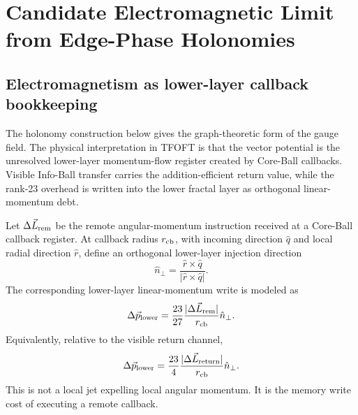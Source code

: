 \documentclass[11pt,a4paper]{article}
\begin{document}
\section{Candidate Electromagnetic Limit from Edge-Phase Holonomies}
\label{sec:maxwell}


\subsection{Electromagnetism as lower-layer callback bookkeeping}
\label{sec:em_callback_bookkeeping}

The holonomy construction below gives the graph-theoretic form of the gauge
field.  The physical interpretation in TFOFT is that the vector potential is
the unresolved lower-layer momentum-flow register created by Core-Ball
callbacks.  Visible Info-Ball transfer carries the addition-efficient return
value, while the rank-23 overhead is written into the lower fractal layer as
orthogonal linear-momentum debt.

Let \(\Delta\vec L_{\rm rem}\) be the remote angular-momentum instruction
received at a Core-Ball callback register.  At callback radius \(r_{\rm cb}\),
with incoming direction \(\hat q\) and local radial direction \(\hat r\), define
an orthogonal lower-layer injection direction
\begin{equation}
  \hat n_\perp=
  \frac{\hat r\times\hat q}{|\hat r\times\hat q|}.
  \label{eq:orthogonal_injection_direction}
\end{equation}
The corresponding lower-layer linear-momentum write is modeled as
\begin{equation}
  \Delta\vec p_{\rm lower}
  =
  \frac{23}{27}
  \frac{|\Delta\vec L_{\rm rem}|}{r_{\rm cb}}
  \hat n_\perp.
  \label{eq:lower_momentum_write}
\end{equation}
Equivalently, relative to the visible return channel,
\begin{equation}
  \Delta\vec p_{\rm lower}
  =
  \frac{23}{4}
  \frac{|\Delta\vec L_{\rm return}|}{r_{\rm cb}}
  \hat n_\perp.
  \label{eq:lower_momentum_write_visible}
\end{equation}
This is not a local jet expelling local angular momentum.  It is the memory
write cost of executing a remote callback.
\end{document}
